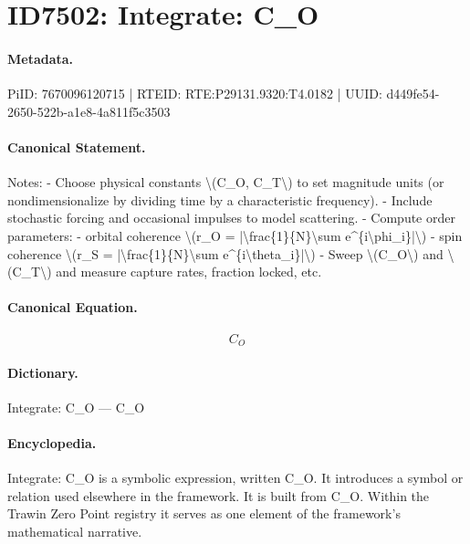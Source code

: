 \section*{ID7502: Integrate: C\_O}
\paragraph{Metadata.}
PiID: 7670096120715 | RTEID: RTE:P29131.9320:T4.0182 | UUID: d449fe54-2650-522b-a1e8-4a811f5c3503

\paragraph{Canonical Statement.}
Notes: - Choose physical constants \textbackslash{}(C\_O, C\_T\textbackslash{}) to set magnitude units (or nondimensionalize by dividing time by a characteristic frequency). - Include stochastic forcing and occasional impulses to model scattering. - Compute order parameters: - orbital coherence \textbackslash{}(r\_O = |\textbackslash{}frac\{1\}\{N\}\textbackslash{}sum e\textasciicircum{}\{i\textbackslash{}phi\_i\}|\textbackslash{}) - spin coherence \textbackslash{}(r\_S = |\textbackslash{}frac\{1\}\{N\}\textbackslash{}sum e\textasciicircum{}\{i\textbackslash{}theta\_i\}|\textbackslash{}) - Sweep \textbackslash{}(C\_O\textbackslash{}) and \textbackslash{}(C\_T\textbackslash{}) and measure capture rates, fraction locked, etc.

\paragraph{Canonical Equation.}
\[
C_O
\]

\paragraph{Dictionary.}
Integrate: C\_O — C\_O

\paragraph{Encyclopedia.}
Integrate: C\_O is a symbolic expression, written C\_O. It introduces a symbol or relation used elsewhere in the framework. It is built from C\_O. Within the Trawin Zero Point registry it serves as one element of the framework's mathematical narrative.
